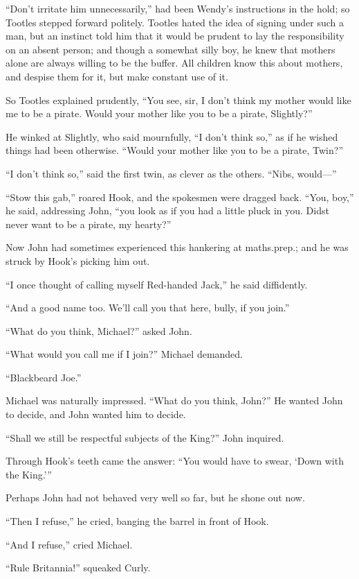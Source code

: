 “Don’t irritate him unnecessarily,” had been Wendy’s instructions in the hold;
so Tootles stepped forward politely.
Tootles hated the idea of signing under such a man,
but an instinct told him that it would be prudent to lay the responsibility on an absent person;
and though a somewhat silly boy,
he knew that mothers alone are always willing to be the buffer.
All children know this about mothers, and despise them for it,
but make constant use of it.

So Tootles explained prudently,
“You see, sir, I don’t think my mother would like me to be a pirate.
Would your mother like you to be a pirate, Slightly?”

He winked at Slightly, who said mournfully, “I don’t think so,”
as if he wished things had been otherwise.
“Would your mother like you to be a pirate, Twin?”

“I don’t think so,” said the first twin, as clever as the others.
“Nibs, would—”

“Stow this gab,” roared Hook, and the spokesmen were dragged back.
“You, boy,” he said, addressing John, “you look as if you had a little pluck in you.
Didst never want to be a pirate, my hearty?”

Now John had sometimes experienced this hankering at maths.\@ prep.\@;
and he was struck by Hook’s picking him out.

“I once thought of calling myself Red-handed Jack,” he said diffidently.

“And a good name too.
We’ll call you that here, bully, if you join.”

“What do you think, Michael?\@” asked John.

“What would you call me if I join?\@” Michael demanded.

“Blackbeard Joe.”

Michael was naturally impressed.
“What do you think, John?”
He wanted John to decide, and John wanted him to decide.

“Shall we still be respectful subjects of the King?\@” John inquired.

Through Hook’s teeth came the answer:
“You would have to swear, ‘Down with the King.’”

Perhaps John had not behaved very well so far, but he shone out now.

“Then I refuse,” he cried, banging the barrel in front of Hook.

“And I refuse,” cried Michael.

“Rule Britannia!\@” squeaked Curly.

